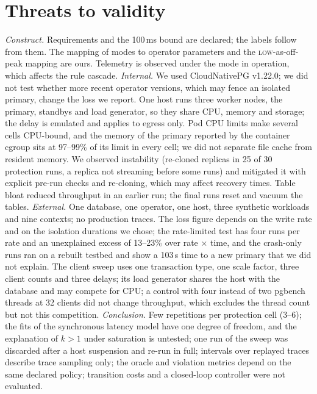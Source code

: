 \documentclass[smallextended]{svjour3}
\begin{document}
\section{Threats to validity}\label{sec:threats}
\emph{Construct.} Requirements and the 100\,ms bound are declared; the labels follow from them. The mapping of modes to operator parameters and the \textsc{low}-as-off-peak mapping are ours. Telemetry is observed under the mode in operation, which affects the rule cascade.
\emph{Internal.} We used CloudNativePG v1.22.0; we did not test whether more recent operator versions, which may fence an isolated primary, change the loss we report. One host runs three worker nodes, the primary, standbys and load generator, so they share CPU, memory and storage; the delay is emulated and applies to egress only. Pod CPU limits make several cells CPU-bound, and the memory of the primary reported by the container cgroup sits at 97--99\% of its limit in every cell; we did not separate file cache from resident memory. We observed instability (re-cloned replicas in 25 of 30 protection runs, a replica not streaming before some runs) and mitigated it with explicit pre-run checks and re-cloning, which may affect recovery times. Table bloat reduced throughput in an earlier run; the final runs reset and vacuum the tables.
\emph{External.} One database, one operator, one host, three synthetic workloads and nine contexts; no production traces. The loss figure depends on the write rate and on the isolation durations we chose; the rate-limited test has four runs per rate and an unexplained excess of 13--23\% over rate $\times$ time, and the crash-only runs ran on a rebuilt testbed and show a 103\,s time to a new primary that we did not explain. The client sweep uses one transaction type, one scale factor, three client counts and three delays; its load generator shares the host with the database and may compete for CPU; a control with four instead of two pgbench threads at 32 clients did not change throughput, which excludes the thread count but not this competition.
\emph{Conclusion.} Few repetitions per protection cell (3--6); the fits of the synchronous latency model have one degree of freedom, and the explanation of $k>1$ under saturation is untested; one run of the sweep was discarded after a host suspension and re-run in full; intervals over replayed traces describe trace sampling only; the oracle and violation metrics depend on the same declared policy; transition costs and a closed-loop controller were not evaluated.
\end{document}
